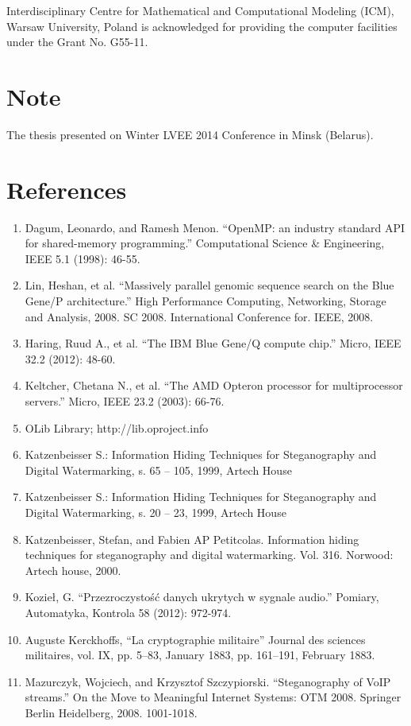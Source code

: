 \documentclass[10pt, a5paper]{article}
\begin{document}
Interdisciplinary Centre for Mathematical and Computational Modeling (ICM), Warsaw University, Poland is acknowledged for providing the computer facilities under the Grant No. G55-11.

\section*{Note}

The thesis presented on Winter LVEE 2014 Conference in Minsk (Belarus).

\section*{References}

\begin{enumerate}
  \item Dagum, Leonardo, and Ramesh Menon. ``OpenMP: an industry standard API for shared-memory programming.'' Computational Science \& Engineering, IEEE 5.1 (1998): 46-55.
  \item Lin, Heshan, et al. ``Massively parallel genomic sequence search on the Blue Gene/P architecture.'' High Performance Computing, Networking, Storage and Analysis, 2008. SC 2008. International Conference for. IEEE, 2008.
  \item Haring, Ruud A., et al. ``The IBM Blue Gene/Q compute chip.'' Micro, IEEE 32.2 (2012): 48-60.
  \item Keltcher, Chetana N., et al. ``The AMD Opteron processor for multiprocessor servers.'' Micro, IEEE 23.2 (2003): 66-76.
  \item OLib Library; http://lib.oproject.info
  \item Katzenbeisser S.: Information Hiding Techniques for Steganography and Digital Watermarking, s. 65 -- 105, 1999, Artech House
  \item Katzenbeisser S.: Information Hiding Techniques for Steganography and Digital Watermarking, s. 20 -- 23, 1999, Artech House
  \item Katzenbeisser, Stefan, and Fabien AP Petitcolas. Information hiding techniques for steganography and digital watermarking. Vol. 316. Norwood: Artech house, 2000.
  \item Kozieł, G. ``Przezroczystość danych ukrytych w sygnale audio.'' Pomiary, Automatyka, Kontrola 58 (2012): 972-974.
  \item Auguste Kerckhoffs, ``La cryptographie militaire'' Journal des sciences militaires, vol. IX, pp. 5–83, January 1883, pp. 161–191, February 1883.
  \item Mazurczyk, Wojciech, and Krzysztof Szczypiorski. ``Steganography of VoIP streams.'' On the Move to Meaningful Internet Systems: OTM 2008. Springer Berlin Heidelberg, 2008. 1001-1018.
\end{enumerate}
\end{document}
